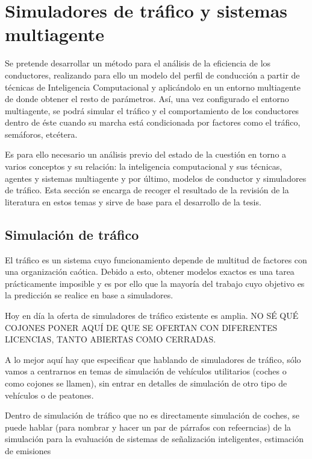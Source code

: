 \chapter{Simuladores de tráfico y sistemas multiagente}
\label{ch:sota-traffic-simulators-and-mas}

Se pretende desarrollar un método para el análisis de la eficiencia de los conductores, realizando para ello un modelo del perfil de conducción a partir de técnicas de Inteligencia Computacional y aplicándolo en un entorno multiagente de donde obtener el resto de parámetros. Así, una vez configurado el entorno multiagente, se podrá simular el tráfico y el comportamiento de los conductores dentro de éste cuando su marcha está condicionada por factores como el tráfico, semáforos, etcétera.

Es para ello necesario un análisis previo del estado de la cuestión en torno a varios conceptos y su relación: la inteligencia computacional y sus técnicas, agentes y sistemas multiagente y por último, modelos de conductor y simuladores de tráfico. Esta sección se encarga de recoger el resultado de la revisión de la literatura en estos temas y sirve de base para el desarrollo de la tesis.

\section{Simulación de tráfico}

El tráfico es un sistema cuyo funcionamiento depende de multitud de factores con una organización caótica. Debido a esto, obtener modelos exactos es una tarea prácticamente imposible y es por ello que la mayoría del trabajo cuyo objetivo es la predicción se realice en base a simuladores.

Hoy en día la oferta de simuladores de tráfico existente es amplia. NO SÉ QUÉ COJONES PONER AQUÍ DE QUE SE OFERTAN CON DIFERENTES LICENCIAS, TANTO ABIERTAS COMO CERRADAS.

A lo mejor aquí hay que especificar que hablando de simuladores de tráfico, sólo vamos a centrarnos en temas de simulación de vehículos utilitarios (coches o como cojones se llamen), sin entrar en detalles de simulación de otro tipo de vehículos o de peatones.

Dentro de simulación de tráfico que no es directamente simulación de coches, se  puede hablar (para nombrar y hacer un par de párrafos con refeerncias) de la simulación para la evaluación de sistemas de señalización inteligentes\cite{jin2016evaluation}, estimación de emisiones\cite{quaassdorff2016microscale}

